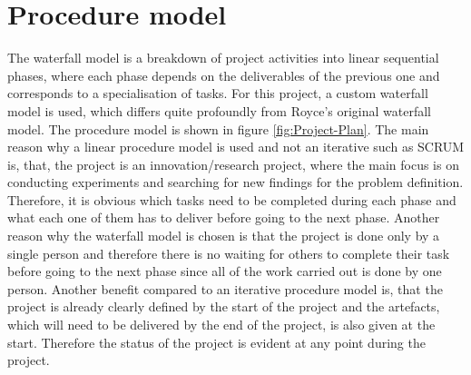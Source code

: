 \section{Procedure model}
\label{sec:Procedure-Model}
The waterfall model is a breakdown of project activities into linear sequential phases, where each phase depends on the deliverables of the previous one and corresponds to a specialisation of tasks. For this project, a custom waterfall model is used, which differs quite profoundly from Royce's original waterfall model. The procedure model is shown in figure \ref{fig:Project-Plan}.
\newline
\newline
The main reason why a linear procedure model is used and not an iterative such as SCRUM is, that, the project is an innovation/research project, where the main focus is on conducting experiments and searching for new findings for the problem definition. Therefore, it is obvious which tasks need to be completed during each phase and what each one of them has to deliver before going to the next phase. Another reason why the waterfall model is chosen is that the project is done only by a single person and therefore there is no waiting for others to complete their task before going to the next phase since all of the work carried out is done by one person. Another benefit compared to an iterative procedure model is, that the project is already clearly defined by the start of the project and the artefacts, which will need to be delivered by the end of the project, is also given at the start. Therefore the status of the project is evident at any point during the project.

